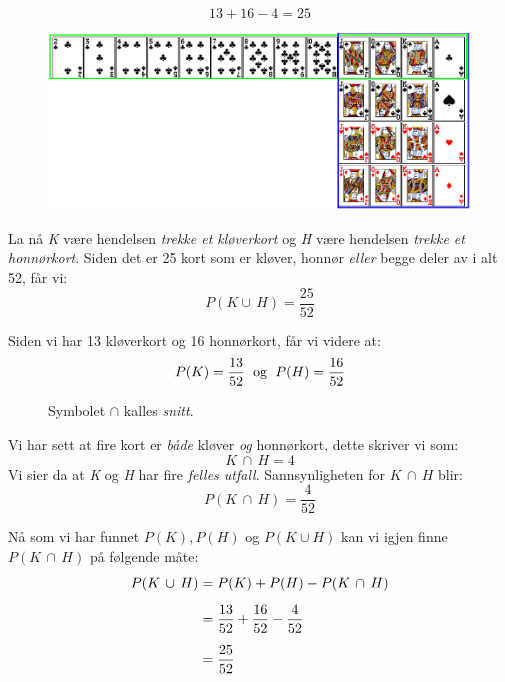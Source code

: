 $$ 13+16-4=25 $$
	\begin{figure}[H]
		\centering
		\includegraphics[scale=0.45]{kort3}
	\end{figure}

La nå \textit{K} være hendelsen \textit{trekke et kløverkort} og \textit{H} være hendelsen \textit{trekke et honnørkort}. Siden det er 25 kort som er kløver, honnør \textsl{eller} begge deler av i alt 52, får vi:
$$P(K\cup\,H)=\frac{25}{52}$$

Siden vi har 13 kløverkort og 16 honnørkort, får vi videre at:
$$P(K)=\frac{13}{52} \text{\; og \;} P(H)=\frac{16}{52}$$
\begin{figure}
	\vs\vs
	\begin{shaded*}
		Symbolet $ \cap $ kalles \textit{snitt}.
	\end{shaded*}
\end{figure}
Vi har sett at fire kort er \textsl{både} kløver \textsl{og} honnørkort, dette skriver vi som: 
$$K\,\cap\,H=4$$
Vi sier da at \textit{K} og \textit{H} har fire \textit{felles utfall}.
Sannsynligheten for $K\,\cap\,H$ blir:
\[ P(K\,\cap\,H)=\frac{4}{52} \]

Nå som vi har funnet $ P(K), P(H)$ og $P(K\cup H)$ kan vi igjen finne  $P(K\,\cap\,H)$ på følgende måte:
\begin{align*}
P(K\,\cup\,H)&=P(K)+P(H)-P(K\,\cap\,H) \br
&= \frac{13}{52}+\frac{16}{52}-\frac{4}{52} \br
&= \frac{25}{52}
\end{align*}

